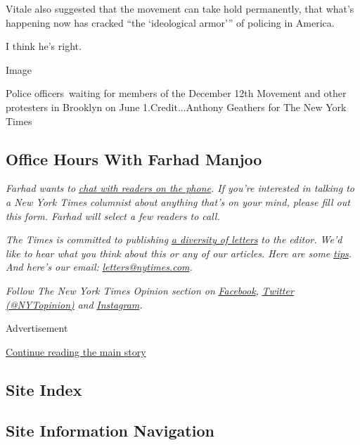 Vitale also suggested that the movement can take hold permanently, that
what's happening now has cracked ``the `ideological armor''' of policing
in America.

I think he's right.

Image

Police officers~waiting for members of the December 12th Movement and
other protesters in Brooklyn on June 1.Credit...Anthony Geathers for The
New York Times

\hypertarget{office-hours-with-farhad-manjoo}{%
\subsection{Office Hours With Farhad
Manjoo}\label{office-hours-with-farhad-manjoo}}

\emph{Farhad wants to}
\href{https://www.nytimes.com/2019/05/16/opinion/farhad-office-hours.html?module=inline}{\emph{chat
with readers on the phone}}\emph{. If you're interested in talking to a
New York Times columnist about anything that's on your mind, please fill
out this form. Farhad will select a few readers to call.}

\emph{The Times is committed to publishing}
\href{https://www.nytimes.com/2019/01/31/opinion/letters/letters-to-editor-new-york-times-women.html}{\emph{a
diversity of letters}} \emph{to the editor. We'd like to hear what you
think about this or any of our articles. Here are some}
\href{https://help.nytimes.com/hc/en-us/articles/115014925288-How-to-submit-a-letter-to-the-editor}{\emph{tips}}\emph{.
And here's our email:}
\href{mailto:letters@nytimes.com}{\emph{letters@nytimes.com}}\emph{.}

\emph{Follow The New York Times Opinion section on}
\href{https://www.facebook.com/nytopinion}{\emph{Facebook}}\emph{,}
\href{http://twitter.com/NYTOpinion}{\emph{Twitter (@NYTopinion)}}
\emph{and}
\href{https://www.instagram.com/nytopinion/}{\emph{Instagram}}\emph{.}

Advertisement

\protect\hyperlink{after-bottom}{Continue reading the main story}

\hypertarget{site-index}{%
\subsection{Site Index}\label{site-index}}

\hypertarget{site-information-navigation}{%
\subsection{Site Information
Navigation}\label{site-information-navigation}}


